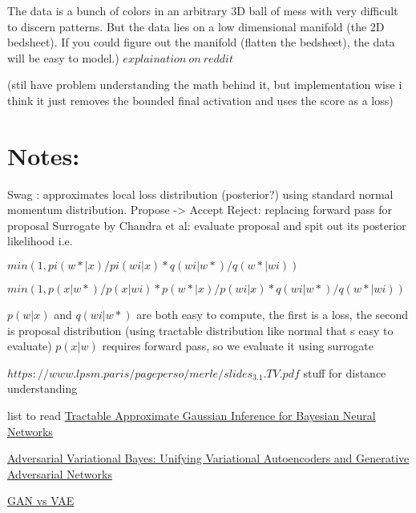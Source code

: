 \documentclass[honours,12pt]{unswthesis}
\numberwithin{equation}{section}
\begin{document}
The data is a bunch of colors in an arbitrary 3D ball of mess with very difficult to discern patterns. But the data lies on a low dimensional manifold (the 2D bedsheet). If you could figure out the manifold (flatten the bedsheet), the data will be easy to model.)  $explaination\ on\ reddit$

(stil have problem understanding the math behind it, but implementation wise i think it just removes the bounded final activation and uses the score as a loss) 


\section{ Notes:}

Swag : approximates local loss distribution (posterior?) using standard normal momentum distribution.
Propose -> Accept Reject: replacing forward pass for proposal 
Surrogate by Chandra et al: evaluate proposal and spit out its posterior likelihood
    i.e. 
    
    $min(1, pi(w*|x)/pi(wi|x) *  q(wi|w*)/q(w*|wi) )$
    
    $min(1, p(x|w*)/p(x|wi) * p(w*|x)/p(wi|x) *  q(wi|w*)/q(w*|wi) )$

    $p(w|x)$ and $q(wi|w*)$ are both easy to compute, the first is a loss, the second is proposal distribution (using tractable distribution like normal that s easy to evaluate)    
    $p(x|w)$ requires forward pass, so we evaluate it using surrogate


\noindent $https://www.lpsm.paris/pageperso/merle/slides_3.1.TV.pdf$ stuff for distance understanding

list to read
\href{https://jmlr.org/papers/volume22/20-1009/20-1009.pdf}{Tractable Approximate Gaussian Inference for
Bayesian Neural Networks
}

\href{https://arxiv.org/pdf/1701.04722.pdf}{Adversarial Variational Bayes:
Unifying Variational Autoencoders and Generative Adversarial Networks}

\href{https://towardsdatascience.com/gans-vs-autoencoders-comparison-of-deep-generative-models-985cf15936ea}{GAN vs VAE}
\end{document}
